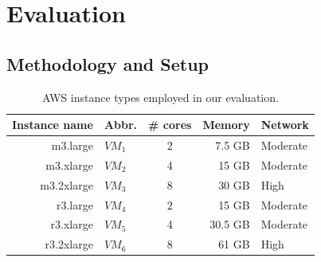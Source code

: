 \section{Evaluation}
\label{sec:eval}
\vspace{10pt}

\subsection{Methodology and Setup}
\vspace{10pt}

\begin{table}
\centering

\begin{tabular}{|r|l|c|r|l|} \hline
Instance name & Abbr.& \# cores&Memory&Network\\ \hline
m3.large & $VM_1$ & 2 & 7.5 GB & Moderate\\ \hline
m3.xlarge & $VM_2$ & 4 & 15 GB & Moderate\\ \hline
m3.2xlarge & $VM_3$ & 8 & 30 GB & High\\ \hline
r3.large & $VM_4$ & 2 & 15 GB & Moderate\\ \hline
r3.xlarge & $VM_5$ & 4 & 30.5 GB & Moderate\\ \hline
r3.2xlarge & $VM_6$ & 8 & 61 GB & High\\ \hline
\hline\end{tabular}
\caption{AWS instance types employed in our evaluation. }
\label{table:awstypes}
\end{table}

